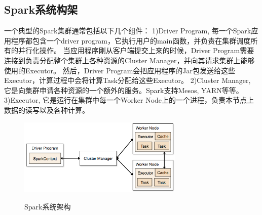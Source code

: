 \documentclass[master]{njuthesis}
\begin{document}
\subsection{Spark系统构架}
一个典型的Spark集群通常包括以下几个组件：
1)Driver Program, 每一个Spark应用程序都包含一个driver program，它执行用户的main函数，并负责在集群调度所有的并行化操作。
当应用程序刚从客户端提交上来的时候，Driver Program需要连接到负责分配整个集群上各种资源的Cluster Manager，并向其请求集群上能够使用的Executor。 
然后，Driver Program会把应用程序的Jar包发送给这些Executor，计算过程中会将计算Task分配给这些Executor。
2)Cluster Manager, 它是向集群申请各种资源的一个额外的服务。Spark支持Mesos, YARN等等。
3)Executor, 它是运行在集群中每一个Worker Node上的一个进程，负责本节点上数据的读写以及各种计算。
\begin{figure}[htbp]
  \centering
  \includegraphics[width= 0.7\textwidth]{figure/spark_components.png}\\
  \caption{Spark系统架构}\label{fig:spark_components}
\end{figure}
\end{document}

